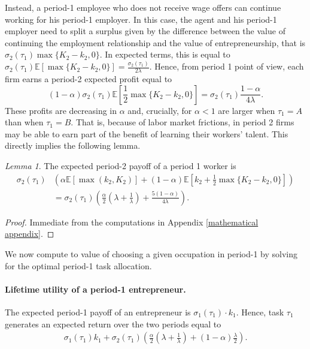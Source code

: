 \documentclass[12pt,american]{paper}
\theoremstyle{remark}
\newtheorem{lemma}{Lemma}
\begin{document}
Instead, a period-1 employee who does not receive wage offers can continue working for his period-1 employer. In this case, the agent and his period-1 employer need to split a surplus given by the difference between the value of continuing the employment relationship and the value of entrepreneurship, that is $\sigma_2(\tau_1)\max \{K_2-k_2,0\}$. In expected terms, this is equal to $\sigma_2(\tau_1) \mathbb E[\max \{K_2-k_2,0\}]=\frac{\sigma_2(\tau_1)}{2\lambda}$. %
Hence,  from period 1 point of view, each firm earns a period-2 expected profit equal to
\[
(1-\alpha) \sigma_2(\tau_1)\mathbb {E}\left[\frac{1}{2}\max\{K_2-k_2,0\}\right]= \sigma_2(\tau_1)  \frac{1-\alpha}{4 \lambda}.
\]
%
These profits are decreasing in $\alpha$ and, crucially, for $\alpha<1$ are larger when $\tau_1=A$ than when $\tau_1=B$. That is, because of labor market frictions, in period 2 firms may be able to earn part of the benefit of learning their workers' talent. This directly implies the following lemma.
\begin{lemma}
The expected period-2 payoff of a period 1 worker is
\begin{align*}
\sigma_2(\tau_1)&\left(\alpha \mathbb E[\max(k_2,K_2)]+(1-\alpha) \mathbb {E}\left[k_2+\frac{1}{2}\max\{K_2-k_2,0\}\right]\right)\\
&=\sigma_2(\tau_1) \left(  \frac{\alpha}{2} \left( \lambda + \frac{1}{\lambda} \right) +  \frac{5(1-\alpha)}{4 \lambda} \right).
\end{align*}
\end{lemma}
\begin{proof}
Immediate from the computations in Appendix \ref{mathematical appendix}.
\end{proof}
%
We now compute to value of choosing a given occupation in period-1 by solving for the optimal period-1 task allocation.

\paragraph{Lifetime utility of a period-1 entrepreneur.}
The expected period-1 payoff of an entrepreneur is $\sigma_1(\tau_1) \cdot k_1$. Hence, task $\tau_1$ generates an expected return over the two periods equal to
\begin{align*} 
\sigma_1(\tau_1) k_1+  \sigma_2(\tau_1)  \left(  \frac{\alpha}{2} \left( \lambda + \frac{1}{\lambda} \right) + (1-\alpha) \frac{\lambda}{2} \right).
\end{align*}
\end{document}
